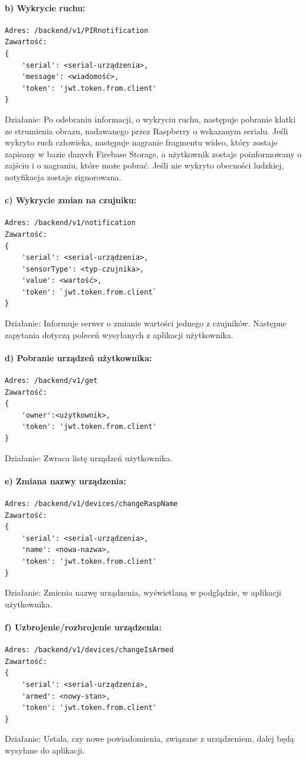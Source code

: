 \paragraph{b) Wykrycie ruchu:}
\begin{verbatim}
Adres: /backend/v1/PIRnotification
Zawartość: 
{
	'serial': <serial-urządzenia>, 
	'message': <wiadomość>, 
	'token': 'jwt.token.from.client'
}
\end{verbatim}
Działanie: Po odebraniu informacji, o wykryciu ruchu, następuje pobranie klatki ze strumienia obrazu, nadawanego przez Raspberry o wskazanym serialu. Jeśli wykryto ruch człowieka, następuje nagranie fragmentu wideo, który zostaje zapisany w bazie danych Firebase Storage, a użytkownik zostaje poinformowany o zajściu i o nagraniu, które może pobrać. Jeśli nie wykryto obecności ludzkiej, notyfikacja zostaje zignorowana.

\paragraph{c) Wykrycie zmian na czujniku:}
\begin{verbatim}
Adres: /backend/v1/notification
Zawartość: 
{
	'serial': <serial-urządzenia>, 
	'sensorType': <typ-czujnika>, 
	'value': <wartość>, 
	'token': `jwt.token.from.client`
}
\end{verbatim}
Działanie: Informuje serwer o zmianie wartości jednego z czujników.\newline
Następne zapytania dotyczą poleceń wysyłanych z aplikacji użytkownika.
\paragraph{d) Pobranie urządzeń użytkownika:}
\begin{verbatim}
Adres: /backend/v1/get
Zawartość: 
{
	'owner':<użytkownik>, 
	'token': 'jwt.token.from.client'
}
\end{verbatim}
Działanie: Zwraca listę urządzeń użytkownika.
\paragraph{e) Zmiana nazwy urządzenia:}
\begin{verbatim}
Adres: /backend/v1/devices/changeRaspName
Zawartość:
{
	'serial': <serial-urządzenia>, 
	'name': <nowa-nazwa>, 
	'token': 'jwt.token.from.client'
}
\end{verbatim}
Działanie: Zmienia nazwę urządzenia, wyświetlaną w podglądzie, w aplikacji użytkownika.
\paragraph{f) Uzbrojenie/rozbrojenie urządzenia:}
\begin{verbatim}
Adres: /backend/v1/devices/changeIsArmed
Zawartość: 
{
	'serial': <serial-urządzenia>, 
	'armed': <nowy-stan>, 
	'token': 'jwt.token.from.client'
}
\end{verbatim}
Działanie: Ustala, czy nowe powiadomienia, związane z urządzeniem, dalej będą wysyłane do aplikacji.
